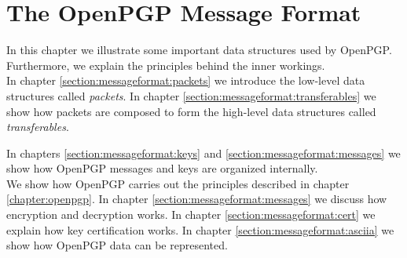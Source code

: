 \chapter{The OpenPGP Message Format} \label{chapter:messageformat}









In this chapter we illustrate some important data structures used by OpenPGP. Furthermore, we explain the principles behind the inner workings. \\

In chapter \ref{section:messageformat:packets} we introduce the low-level data structures called \textit{packets}. In chapter \ref{section:messageformat:transferables} we show how packets are composed to form the high-level data structures called \textit{transferables}.

In chapters \ref{section:messageformat:keys} and \ref{section:messageformat:messages} we show how OpenPGP messages and keys are organized internally. \\

We show how OpenPGP carries out the principles described in chapter \ref{chapter:openpgp}.
In chapter \ref{section:messageformat:messages} we discuss how encryption and decryption works. In chapter \ref{section:messageformat:cert} we explain how key certification works. In chapter \ref{section:messageformat:asciia} we show how OpenPGP data can be represented.

